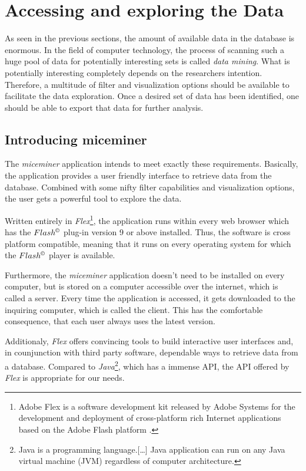 \newpage
\section{Accessing and exploring the Data }
\label{sec:dataaccessandexp}

As seen in the previous sections, the amount of available data in the database is enormous. In the field of computer technology, the process of scanning such a huge pool of data for potentially interesting sets is called \textit{data mining}. What is potentially interesting completely depends on the researchers intention. Therefore, a multitude of filter and visualization options should be available to facilitate the data exploration. Once a desired set of data has been identified, one should be able to export that data for further analysis. 

\subsection{Introducing miceminer}
\label{subsec:dataexp}

The \textit{miceminer} application intends to meet exactly these requirements. Basically, the application provides a user friendly interface to retrieve data from the database. Combined with some nifty filter capabilities and visualization options, the user gets a powerful tool to explore the data.

Written entirely in \textit{Flex}\footnote{Adobe Flex is a software development kit released by Adobe Systems for the development and deployment of cross-platform rich Internet applications based on the Adobe Flash platform \cite{wiki:flex}.}, the application runs within every web browser which has the $Flash^{\copyright}$ plug-in version 9 or above installed. Thus, the software is cross platform compatible, meaning that it runs on every operating system for which the $Flash^{\copyright}$ player is available. 

Furthermore, the \textit{miceminer} application doesn't need to be installed on every computer, but is stored on a computer accessible over the internet, which is called a server. Every time the application is accessed, it gets downloaded to the inquiring computer, which is called the client. This has the comfortable consequence, that each user always uses the latest version.

Additionaly, \textit{Flex} offers convincing tools to build interactive user interfaces and, in counjunction with third party software, dependable ways to retrieve data from a database. Compared to \textit{Java}\footnote{Java is a programming language.[\ldots] Java application can run on any Java virtual machine (JVM) regardless of computer architecture\cite{wiki:java}.}, which has a immense \ac{API}, the \ac{API} offered by \textit{Flex} is appropriate for our needs.

